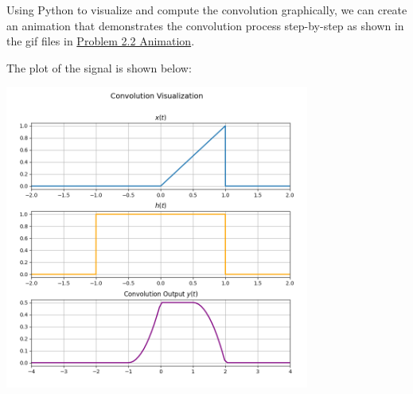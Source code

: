 \documentclass[a4paper, 10pt]{article}
\begin{document}
\begin{solution}
    Using Python to visualize and compute the convolution graphically,
    we can create an animation that demonstrates the convolution process step-by-step
    as shown in the gif files in \href{https://github.com/patthadon-p/CEDT-2110203-CEM-II/blob/main/signal/homework-2/images/problem_2_2.gif}{Problem 2.2 Animation}.
    
    \vspace{3mm}
    
    The plot of the signal is shown below:
    \begin{center}
        \includegraphics[width=0.75\textwidth]{images/problem_2_2_snapshot.png}
    \end{center}
\end{solution}

\newpage
\end{document}
